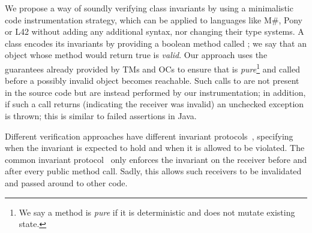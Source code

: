 \loseSpace
We propose a way of soundly verifying class invariants by using a minimalistic code instrumentation strategy, which can be applied to languages like M\#, Pony or  L42  without adding any additional syntax, nor changing their type systems.
 A class encodes its invariants by providing a boolean method called \Q@invariant@; we say that an object whose \Q@invariant@ method would return true is \emph{valid}. Our approach uses the guarantees already provided by TMs and OCs to ensure that \Q@invariant@ is \emph{pure}\footnote{We say a method is \emph{pure} if it is deterministic and does not mutate existing state.} and called before a possibly invalid object becomes reachable. Such calls to \Q@invariant@ are not present in the source code but are instead performed by our instrumentation; in addition, if such a call returns \Q@false@ (indicating the receiver was invalid) an unchecked exception is thrown; this is similar to failed assertions in Java.







Different verification approaches have different invariant protocols~\cite{FlexibleInvariants}, specifying when the invariant is expected to hold and when it is allowed to be violated.
The common invariant protocol~\cite{?}
only enforces the invariant on the receiver before and after every public method call. Sadly, this allows such receivers to be invalidated and passed around to other code.

